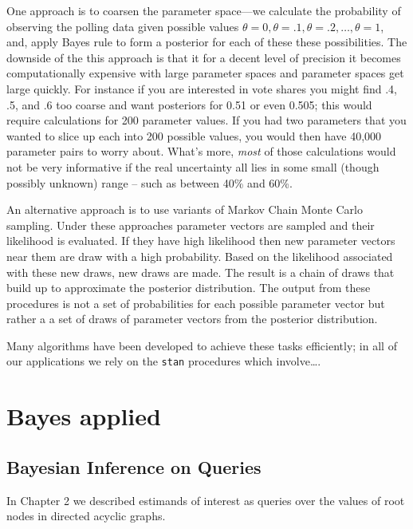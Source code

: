 \documentclass[12pt,]{book}
\begin{document}
One approach is to coarsen the parameter space---we calculate the probability of observing the polling data given possible values \(\theta = 0, \theta = .1, \theta = .2, \dots, \theta = 1\), and, apply Bayes rule to form a posterior for each of these these possibilities. The downside of the this approach is that it for a decent level of precision it becomes computationally expensive with large parameter spaces and parameter spaces get large quickly. For instance if you are interested in vote shares you might find .4, .5, and .6 too coarse and want posteriors for 0.51 or even 0.505; this would require calculations for 200 parameter values. If you had two parameters that you wanted to slice up each into 200 possible values, you would then have 40,000 parameter pairs to worry about. What's more, \emph{most} of those calculations would not be very informative if the real uncertainty all lies in some small (though possibly unknown) range -- such as between 40\% and 60\%.

An alternative approach is to use variants of Markov Chain Monte Carlo sampling. Under these approaches parameter vectors are sampled and their likelihood is evaluated. If they have high likelihood then new parameter vectors near them are draw with a high probability. Based on the likelihood associated with these new draws, new draws are made. The result is a chain of draws that build up to approximate the posterior distribution. The output from these procedures is not a set of probabilities for each possible parameter vector but rather a a set of draws of parameter vectors from the posterior distribution.

Many algorithms have been developed to achieve these tasks efficiently; in all of our applications we rely on the \texttt{stan} procedures which involve\ldots{}.

\hypertarget{bayes-applied}{%
\section{Bayes applied}\label{bayes-applied}}

\hypertarget{bayesian-inference-on-queries}{%
\subsection{Bayesian Inference on Queries}\label{bayesian-inference-on-queries}}

In Chapter 2 we described estimands of interest as queries over the values of root nodes in directed acyclic graphs.
\end{document}
